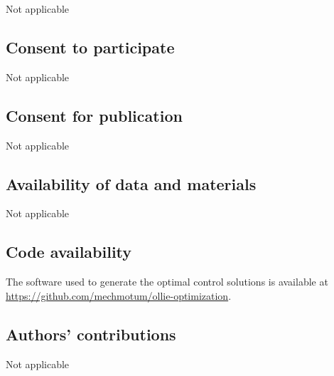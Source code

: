 \documentclass[default,iicol,pdflatex]{sn-jnl}
\begin{document}
Not applicable

\subsection*{Consent to participate}

Not applicable

\subsection*{Consent for publication}
Not applicable
\subsection*{Availability of data and materials}
Not applicable
\subsection*{Code availability}
The software used to generate the optimal control solutions is available at \url{https://github.com/mechmotum/ollie-optimization}.
\subsection*{Authors' contributions}
Not applicable



\end{document}
